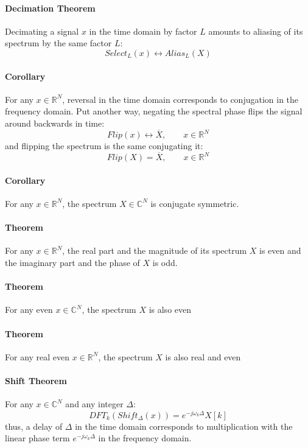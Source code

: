 \paragraph{Decimation Theorem}
Decimating a signal $x$ in the time domain by factor $L$ amounts to aliasing of its spectrum by the same factor $L$:
\begin{equation}
  Select_L(x) \leftrightarrow Alias_L(X)
\end{equation}

\paragraph{Corollary}
For any $x \in \mathbb{R}^N$, reversal in the time domain corresponds to conjugation in the frequency domain. Put another way, negating the spectral phase flips the signal around backwards in time:
\begin{equation}
 Flip(x) \leftrightarrow \overline{X}, \qquad x \in \mathbb{R}^N
\end{equation}
and flipping the spectrum is the same conjugating it:
\begin{equation}
 Flip(X) = \overline{X}, \qquad x \in \mathbb{R}^N
\end{equation}

\paragraph{Corollary}
For any $x \in \mathbb{R}^N$, the spectrum $X \in \mathbb{C}^N$ is conjugate symmetric.

\paragraph{Theorem}
For any $x \in \mathbb{R}^N$, the real part and the magnitude of its spectrum $X$ is even and the imaginary part and the phase of $X$ is odd.

\paragraph{Theorem}
For any even $x \in \mathbb{C}^N$, the spectrum $X$ is also even

\paragraph{Theorem}
For any real even $x \in \mathbb{R}^N$, the spectrum $X$ is also real and even

\paragraph{Shift Theorem}
For any $x \in \mathbb{C}^N$ and any integer $\Delta$:
\begin{equation}
 DFT_k( Shift_{\Delta}(x) ) = e^{-j \omega_k \Delta} X[k]
\end{equation}
thus, a delay of $\Delta$ in the time domain corresponds to multiplication with the linear phase term $e^{-j \omega_k \Delta}$ in the frequency domain.

